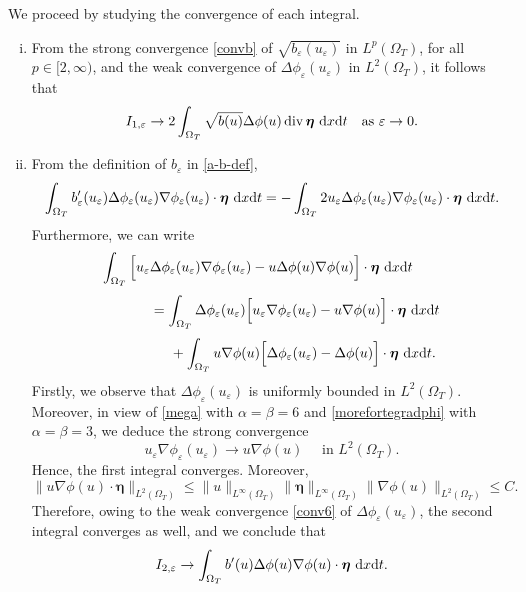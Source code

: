 \documentclass[11pt,  reqno]{amsart}%
\theoremstyle{plain}
\theoremstyle{definition}
\theoremstyle{remark}
\numberwithin{equation}{section}
\newcommand{\ve}{\varepsilon}
\def\div{\,\mathrm{div}}
\newcommand{\dx}{\textup{d}x}
\newcommand{\dt}{\textup{d}t}
\begin{document}
We proceed by studying the convergence of each integral. 
\begin{enumerate}[i)]
\item From the strong convergence \eqref{convb} of $\sqrt{b_\ve(u_\ve)}$ in $ L^p(\Omega_T)$, for all $p \in [2,\infty)$, and the weak convergence of $\Delta \phi_\ve(u_\ve)$ in $L^2(  \Omega_T)$,  it follows that
$$
I_{1,\ve} \to 2\int_{\Omega_T}  \sqrt{b(u)}\Delta \phi(u) \div \,  \boldsymbol{\eta} \ \dx \dt \quad \mbox{as }\ve \to 0.$$

 \item From the definition of $b_\ve$ in \eqref{a-b-def},
$$\int_{\Omega_T} b'_\ve(u_\ve) \Delta \phi_\ve(u_\ve) \nabla\phi_\ve(u_\ve) \cdot \boldsymbol{\eta}\ \dx \dt = -\int_{\Omega_T} 2u_\ve \Delta \phi_\ve(u_\ve) \nabla\phi_\ve(u_\ve) \cdot \boldsymbol{\eta} \ \dx \dt. $$
Furthermore, we can write
\begin{align*}
    \int_{\Omega_T}  \Big[u_\ve& \Delta \phi_\ve(u_\ve) \nabla \phi_\ve(u_\ve) - u \Delta \phi(u)\nabla \phi(u)\Big]\cdot \boldsymbol{\eta} \ \dx \dt \\[3pt]
    &=\int_{\Omega_T}  \Delta \phi_\ve(u_\ve) \Big[ u_\ve\nabla \phi_\ve(u_\ve)-u\nabla\phi(u)\Big]\cdot \boldsymbol{\eta} \ \dx \dt \\[3pt]
    &\hspace{0,5 cm}+ \int_{\Omega_T} u \nabla \phi(u) \Big[ \Delta \phi_\ve(u_\ve)-\Delta\phi(u)\Big]\cdot \boldsymbol{\eta} \ \dx \dt.
\end{align*}
Firstly, we observe that $\Delta \phi_\ve(u_\ve)$ is uniformly bounded in $L^2( \Omega_T )$. Moreover, in view of  \eqref{mega} with $\alpha=\beta=6$ and \eqref{morefortegradphi} with $\alpha=\beta=3$, we deduce the strong convergence
$$u_\ve \nabla\phi_\ve(u_\ve) \to u \nabla \phi(u) \quad \mbox{ in }L^2(  \Omega_T  ).$$
Hence, the first integral converges. Moreover,
$$\|u \nabla \phi(u)\cdot \boldsymbol{\eta}\|_{L^2(\Omega_T)}\le \|u\|_{L^\infty(\Omega_T)}\|\boldsymbol{\eta}\|_{L^\infty(\Omega_T)}\|\nabla \phi(u)\|_{L^2(\Omega_T)}\le C.$$
Therefore, owing to the weak convergence \eqref{conv6} of $\Delta \phi_\ve(u_\ve)$, the second integral converges as well, and we conclude that
$$I_{2, \ve} \to \int_{\Omega_T}  b'(u) \Delta \phi(u) \nabla \phi(u) \cdot \boldsymbol{\eta}\ \dx \dt.$$


\end{enumerate}
\end{document}
